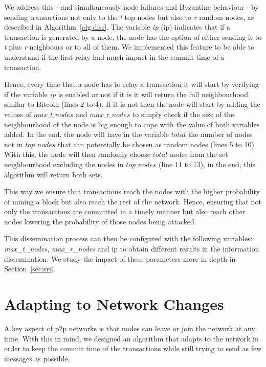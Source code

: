 We address this - and simultaneously node failures and Byzantine behaviour - by sending transactions not only to the \textsl{t} top nodes but also to \textsl{r} random nodes, as described in Algorithm~\ref{alg:diss}. The variable \textsl{\acrshort{ip}} (\acrlong{ip}) indicates that if a transaction is generated by a node, the node has the option of either sending it to \textit{t} plus \textit{r} neighbours or to all of them. We implemented this feature to be able to understand if the first relay had much impact in the commit time of a transaction.

Hence, every time that a node has to relay a transaction it will start by verifying if the variable \textsl{\acrshort{ip}} is enabled or not if it is it will return the full neighbourhood similar to Bitcoin (lines 2 to 4). If it is not then the node will start by adding the values of $max\_t\_nodes$ and $max\_r\_nodes$ to simply check if the size of the neighbourhood of the node is big enough to cope with the value of both variables added. In the end, the node will have in the variable $total$ the number of nodes not in $top\_nodes$ that can potentially be chosen as random nodes (lines 5 to 10). With this, the node will then randomly choose $total$ nodes from the set neighbourhood excluding the nodes in $top\_nodes$ (line 11 to 13), in the end, this algorithm will return both sets.

This way we ensure that transactions reach the nodes with the higher probability of mining a block but also reach the rest of the network. Hence, ensuring that not only the transactions are committed in a timely manner but also reach other nodes lowering the probability of those nodes being attacked.

This dissemination process can then be configured with the following variables: \textsl{max\_t\_nodes}, \textsl{max\_r\_nodes} and \acrshort{ip} to obtain different results in the information dissemination.
We study the impact of these parameters more in depth in Section~\ref{sec:sri}.

\section{Adapting to Network Changes}
\label{sec:nc}
A key aspect of \acrlong{p2p} networks is that nodes can leave or join the network at any  time. With this in mind, we designed an algorithm that adapts to the network in order to keep the commit time of the transactions while still trying to send as few messages as possible. 

